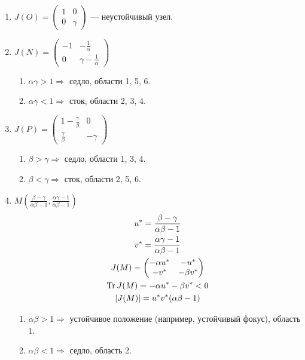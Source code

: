 \begin{enumerate}
\item $J(O) = \begin{pmatrix}
1 & 0\\
0 & \gamma
\end{pmatrix}$ --- неустойчивый узел.
\item $J(N) = \begin{pmatrix}
-1 & -\frac{1}{\alpha}\\
0 & \gamma - \frac{1}{\alpha}
\end{pmatrix}
$
\begin{enumerate}[label = \alph*)]
\item $\alpha \gamma > 1 \Rightarrow$ седло, области 1, 5, 6.\\
\item $\alpha \gamma < 1 \Rightarrow$ сток, области 2, 3, 4.\\
\end{enumerate}
\item $J(P) = \begin{pmatrix}
1 - \frac{\gamma}{\beta} & 0\\
\frac{\gamma}{\beta} & -\gamma
\end{pmatrix}$
\begin{enumerate}[label = \alph*)]
\item $\beta > \gamma \Rightarrow$ седло, области 1, 3, 4.
\item $\beta < \gamma \Rightarrow$ сток, области 2, 5, 6.
\end{enumerate}
\item $M\left(\frac{\beta - \gamma}{\alpha\beta - 1}, \frac{\alpha\gamma - 1}{\alpha \beta - 1}\right)$
\begin{gather*}
u^* = \frac{\beta - \gamma}{\alpha\beta - 1}\\
v^* = \frac{\alpha\gamma - 1}{\alpha \beta - 1}\\
J(M) = \begin{pmatrix}
-\alpha u^* & -u^*\\
-v^* & -\beta v^*
\end{pmatrix}\\
\TrCh6 J(M) = -\alpha u^* - \beta v^* < 0\\
|J(M)| = u^* v^* (\alpha \beta - 1)
\end{gather*}
\begin{enumerate}[label = \alph*)]
\item $\alpha \beta > 1 \Rightarrow$ устойчивое положение (например, устойчивый фокус), область 1.
\item$\alpha \beta < 1 \Rightarrow$ седло, область 2.
\end{enumerate}
\end{enumerate}
